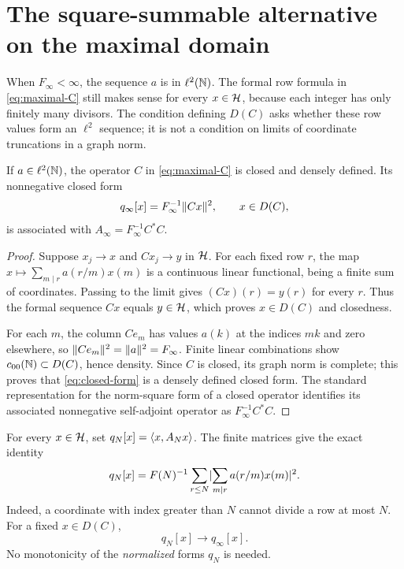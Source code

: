 \section{The square-summable alternative on the maximal domain}
\label{sec:summable}

When $F_\infty<\infty$, the sequence $a$ is in $\ell^2(\mathbb{N})$.
The formal row formula in \eqref{eq:maximal-C} still makes sense for
every $x\in\mathcal{H}$, because each integer has only finitely many divisors.
The condition defining $D(C)$ asks whether these row values form an
$\ell^2$ sequence; it is not a condition on limits of coordinate
truncations in a graph norm.

\begin{lemma}
\label{lem:closed}
If $a\in\ell^2(\mathbb{N})$, the operator $C$ in \eqref{eq:maximal-C} is
closed and densely defined. Its nonnegative closed form
\begin{equation}
 q_\infty[x]=F_\infty^{-1}\lVert Cx\rVert^2,\qquad x\in D(C),
 \label{eq:closed-form}
\end{equation}
is associated with $A_\infty=F_\infty^{-1}C^*C$.
\end{lemma}
\begin{proof}
Suppose $x_j\to x$ and $Cx_j\to y$ in $\mathcal{H}$.
For each fixed row $r$, the map
$x\mapsto\sum_{m\mid r}a(r/m)x(m)$ is a continuous linear functional,
being a finite sum of coordinates. Passing to the limit gives
$(Cx)(r)=y(r)$ for every $r$. Thus the formal sequence $Cx$ equals
$y\in\mathcal{H}$, which proves $x\in D(C)$ and closedness.

For each $m$, the column $Ce_m$ has values $a(k)$ at the indices $mk$
and zero elsewhere, so $\lVert Ce_m\rVert^2=\lVert a\rVert^2=F_\infty$.
Finite linear combinations show $c_{00}(\mathbb{N})\subset D(C)$, hence density.
Since $C$ is closed, its graph norm is complete; this proves that
\eqref{eq:closed-form} is a densely defined closed form.
The standard representation for the norm-square form of a closed
operator identifies its associated nonnegative self-adjoint operator
as $F_\infty^{-1}C^*C$.
\end{proof}

For every $x\in\mathcal{H}$, set $q_N[x]=\langle x,A_Nx\rangle$.
The finite matrices give the exact identity
\begin{equation}
 q_N[x]=F(N)^{-1}
 \sum_{r\le N}
 \lvert \sum_{m\mid r}a(r/m)x(m)\rvert^2.
 \label{eq:row-energy}
\end{equation}
Indeed, a coordinate with index greater than $N$ cannot divide a row
at most $N$. For a fixed $x\in D(C)$,
\begin{equation}
 q_N[x]\longrightarrow q_\infty[x].
 \label{eq:pointwise-form}
\end{equation}
No monotonicity of the \emph{normalized} forms $q_N$ is needed.

